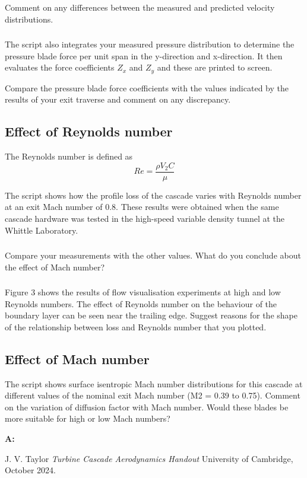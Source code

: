 \documentclass{article}
\begin{document}
\subsubsection{}
Comment on any differences between the measured and predicted velocity
distributions.

\subsubsection{}
The script also integrates your measured pressure distribution to determine the pressure
blade force per unit span in the y-direction and x-direction. It then evaluates the force
coefficients $Z_x$ and $Z_y$ and these are printed to screen.

Compare the pressure blade force coefficients with the values indicated by the results of your
exit traverse and comment on any discrepancy.

\subsection{Effect of Reynolds number}

The Reynolds number is defined as
\begin{equation}
    Re = \frac{\rho V_2 C}{\mu}
\end{equation}

The script shows how the profile loss of the cascade varies with Reynolds number at an exit
Mach number of 0.8. These results were obtained when the same cascade hardware was tested
in the high-speed variable density tunnel at the Whittle Laboratory.

\subsubsection{}
Compare your measurements with the other values. What do you conclude about the
effect of Mach number?

\subsubsection{}
Figure 3 shows the results of flow visualisation experiments at high and low Reynolds
numbers. The effect of Reynolds number on the behaviour of the boundary layer can be seen
near the trailing edge. Suggest reasons for the shape of the relationship between loss and
Reynolds number that you plotted.


\subsection{Effect of Mach number}
The script shows surface isentropic Mach number distributions for this cascade at different
values of the nominal exit Mach number (M2 = 0.39 to 0.75). Comment on the variation of
diffusion factor with Mach number. Would these blades be more suitable for high or low Mach
numbers?

\textbf{A:}

\begin{thebibliography}{9}


  J. V. Taylor
  \emph{Turbine Cascade Aerodynamics Handout}
  University of Cambridge,
  October 2024.

\end{thebibliography}
\end{document}
